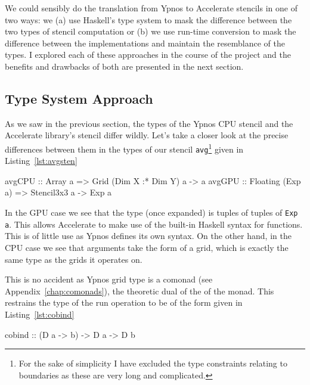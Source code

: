 \documentclass[12pt,a4paper,oneside]{scrbook}
\begin{document}
We could sensibly do the translation from Ypnos to Accelerate stencils in one of
two ways: we (a) use Haskell's type system to mask the difference between the
two types of stencil computation or (b) we use run-time conversion to mask the
difference between the implementations and maintain the resemblance of the
types. I explored each of these approaches in the course of the project and the
benefits and drawbacks of both are presented in the next section.

\subsection{Type System Approach}
\label{sec:typesysapp}

As we saw in the previous section, the types of the Ypnos CPU stencil and the
Accelerate library's stencil differ wildly. Let's take a closer look at the
precise differences between them in the types of our stencil
\texttt{avg}\footnote{For the sake of simplicity I have excluded the type
  constraints relating to boundaries as these are very long and complicated.}
given in Listing~\ref{lst:avgsten}

\begin{hflisting}[label={lst:avgsten}, caption={The average function implemented
    on both the CPU and GPU. Notice how the types differ. The expression
    \texttt{Dim X :* Dim Y} denotes a 2D grid.}]
avgCPU :: Array a =>
          Grid (Dim X :* Dim Y) a -> a
avgGPU :: Floating (Exp a) =>
          Stencil3x3 a -> Exp a
\end{hflisting}

In the GPU case we see that the type (once expanded) is tuples of tuples of
\texttt{Exp a}. This allows Accelerate to make use of the built-in Haskell
syntax for functions. This is of little use as Ypnos defines its own syntax. On
the other hand, in the CPU case we see that arguments take the form of a grid,
which is exactly the same type as the grids it operates on.

This is no accident as Ypnos grid type is a comonad (see
Appendix~\ref{chap:comonads}), the theoretic dual of the of the monad. This
restrains the type of the run operation to be of the form given in
Listing~\ref{lst:cobind}

\begin{hflisting}[label={lst:cobind}, caption={The definition of cobind. Let
    \texttt{D} be a grid of a certain dimension and \texttt{a} and \texttt{b} be
    the types of that grid.}]
cobind :: (D a -> b) -> D a -> D b
\end{hflisting}
\end{document}
